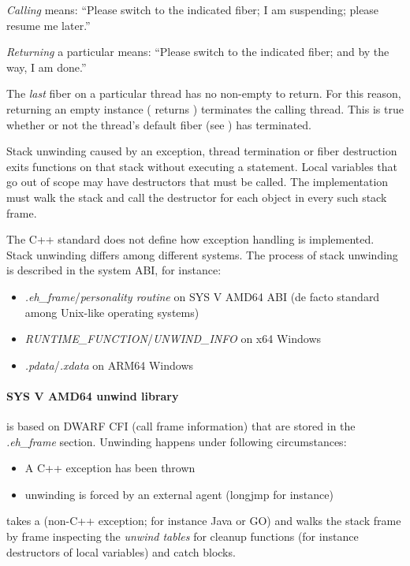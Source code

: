 \emph{Calling} \resume means: ``Please switch to the indicated fiber; I
am suspending; please resume me later.''

\emph{Returning} a particular \fiber means: ``Please switch to the indicated
fiber; and by the way, I am done.''

The \emph{last} fiber on a particular thread has no non-empty \fiber to
return. For this reason, returning an empty \fiber instance (\opbool
returns ) terminates the calling thread. This is true whether or
not the thread's default fiber (see ) has
terminated.

\label{unwinding}

Stack unwinding caused by an exception, thread termination or fiber
destruction exits functions on that stack without executing a  statement. Local variables
that go out of scope may have destructors that must be called.
The implementation must walk the stack and call the destructor for each object
in every such stack frame.

The C++ standard does not define how exception handling is implemented. Stack unwinding differs
among different systems. The process of stack unwinding is described in the
system ABI, for instance:
\begin{itemize}
    \item \emph{.eh\_frame}/\emph{personality routine} on SYS V AMD64 ABI\cite{SYSVAMD64} (de facto standard among Unix-like operating systems)
    \item \emph{RUNTIME\_FUNCTION}/\emph{UNWIND\_INFO} on x64 Windows\cite{WinX64}
    \item \emph{.pdata}/\emph{.xdata} on ARM64 Windows\cite{WinARM64}
\end{itemize}

\paragraph{SYS V AMD64 unwind library}
is based on DWARF CFI (call frame information) that are stored in the \emph{.eh\_frame} section.
Unwinding happens under following circumstances:
\begin{itemize}
    \item A C++ exception has been thrown
    \item unwinding is forced by an external agent (longjmp for instance)
\end{itemize}
\uwforced takes a \foreignex (non-C++ exception; for instance Java or GO) and walks the stack frame by frame
inspecting the \emph{unwind tables} for cleanup functions (for instance destructors of
local variables) and catch blocks.

